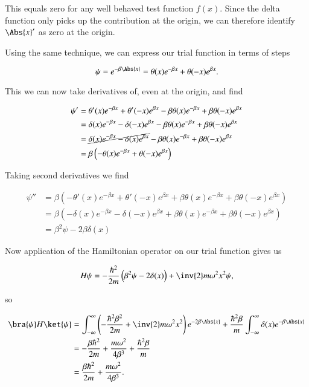 This equals zero for any well behaved test function $f(x)$.  Since the delta function only picks up the contribution at the origin, we can therefore identify $\Abs{x}'$ as zero at the origin.

Using the same technique, we can express our trial function in terms of steps

\begin{equation}\label{eqn:variationHarmonicOscillator:350}
\psi = e^{-\beta \Abs{x}} = \theta(x) e^{-\beta x} + \theta(-x) e^{\beta x}.
\end{equation}

This we can now take derivatives of, even at the origin, and find

\begin{align*}
\psi' 
&= \theta'(x) e^{-\beta x} + \theta'(-x) e^{\beta x} -\beta \theta(x) e^{-\beta x} + \beta \theta(-x) e^{\beta x} \\
&= \delta(x) e^{-\beta x} - \delta(-x) e^{\beta x} -\beta \theta(x) e^{-\beta x} + \beta \theta(-x) e^{\beta x} \\
&= \cancel{\delta(x) e^{-\beta x} - \delta(x) e^{\beta x}} -\beta \theta(x) e^{-\beta x} + \beta \theta(-x) e^{\beta x} \\
&= \beta \left( 
-\theta(x) e^{-\beta x} + \theta(-x) e^{\beta x} 
\right)
\end{align*}

Taking second derivatives we find

\begin{align*}
\psi''
&= \beta \left( 
-\theta'(x) e^{-\beta x} + \theta'(-x) e^{\beta x} 
+\beta \theta(x) e^{-\beta x} + \beta \theta(-x) e^{\beta x} 
\right) \\
&= 
\beta \left( 
-\delta(x) e^{-\beta x} - \delta(-x) e^{\beta x} 
+\beta \theta(x) e^{-\beta x} + \beta \theta(-x) e^{\beta x} 
\right) \\
&= \beta^2 \psi - 2 \beta \delta(x)
\end{align*}

Now application of the Hamiltonian operator on our trial function gives us

\begin{equation}\label{eqn:variationHarmonicOscillator:370}
H \psi = -\frac{\hbar^2}{2m} \left( \beta^2 \psi - 2 \delta(x) \right) + \inv{2} m \omega^2 x^2 \psi,
\end{equation}

so

\begin{align*}
\bra{\psi} H \ket{\psi} &= 
\int_{-\infty}^\infty 
\left( 
-\frac{\hbar^2 \beta^2}{2m} + \inv{2} m \omega^2 x^2 
\right) e^{-2 \beta \Abs{x} }
+ \frac{\hbar^2 \beta}{m}
\int_{-\infty}^\infty \delta(x)
e^{- \beta \Abs{x}} \\
&=
-\frac{\beta \hbar^2}{2m} + \frac{m \omega^2}{4 \beta^3} + \frac{\hbar^2 \beta}{m} \\
&=
\frac{\beta \hbar^2}{2m} + \frac{m \omega^2}{4 \beta^3}.
\end{align*}

